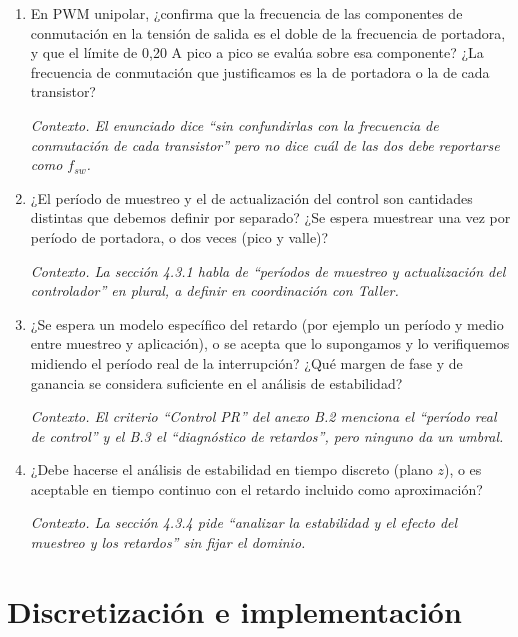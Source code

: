 \documentclass[11pt,a4paper]{article}
\newcommand{\ctx}[1]{\par\vspace{0.2em}\small\textit{Contexto. #1}\normalsize}
\begin{document}
\begin{enumerate}[resume]
  \item En PWM unipolar, ¿confirma que la frecuencia de las componentes de conmutación en la tensión de salida es el doble de la frecuencia de portadora, y que el límite de 0,20 A pico a pico se evalúa sobre esa componente? ¿La frecuencia de conmutación que justificamos es la de portadora o la de cada transistor?
  \ctx{El enunciado dice ``sin confundirlas con la frecuencia de conmutación de cada transistor'' pero no dice cuál de las dos debe reportarse como $f_{sw}$.}

  \item ¿El período de muestreo y el de actualización del control son cantidades distintas que debemos definir por separado? ¿Se espera muestrear una vez por período de portadora, o dos veces (pico y valle)?
  \ctx{La sección 4.3.1 habla de ``períodos de muestreo y actualización del controlador'' en plural, a definir en coordinación con Taller.}

  \item ¿Se espera un modelo específico del retardo (por ejemplo un período y medio entre muestreo y aplicación), o se acepta que lo supongamos y lo verifiquemos midiendo el período real de la interrupción? ¿Qué margen de fase y de ganancia se considera suficiente en el análisis de estabilidad?
  \ctx{El criterio ``Control PR'' del anexo B.2 menciona el ``período real de control'' y el B.3 el ``diagnóstico de retardos'', pero ninguno da un umbral.}

  \item ¿Debe hacerse el análisis de estabilidad en tiempo discreto (plano $z$), o es aceptable en tiempo continuo con el retardo incluido como aproximación?
  \ctx{La sección 4.3.4 pide ``analizar la estabilidad y el efecto del muestreo y los retardos'' sin fijar el dominio.}
\end{enumerate}

\section{Discretización e implementación}
\end{document}
